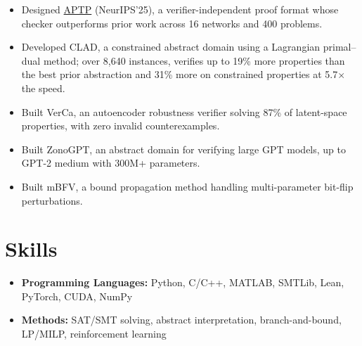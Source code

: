 \documentclass[11pt]{article}
\newcommand{\role}[4]{\item \textbf{#1}, #2, {\itshape #3}\hfill #4}
\begin{document}
\begin{itemize}
\begin{itemize}[before=\small,label=\textbullet]
                \item Designed \href{https://github.com/dynaroars/aptpchecker}{APTP} (NeurIPS'25), a verifier-independent proof format whose checker outperforms prior work across 16 networks and 400 problems.
                \item Developed CLAD, a constrained abstract domain using a Lagrangian primal--dual method; over 8{,}640 instances, verifies up to 19\% more properties than the best prior abstraction and 31\% more on constrained properties at 5.7$\times$ the speed.
                \item Built VerCa, an autoencoder robustness verifier solving 87\% of latent-space properties, with zero invalid counterexamples.
                \item Built ZonoGPT, an abstract domain for verifying large GPT models, up to GPT-2 medium with 300M+ parameters.
                \item Built mBFV, a bound propagation method handling multi-parameter bit-flip perturbations.
            \end{itemize}
    \end{itemize}

\section{Skills}
    \begin{itemize}
        \item \textbf{Programming Languages:} Python, C/C++, MATLAB, SMTLib, Lean, PyTorch, CUDA, NumPy
        \item \textbf{Methods:} SAT/SMT solving, abstract interpretation, branch-and-bound, LP/MILP, reinforcement learning
    \end{itemize}
\end{document}
